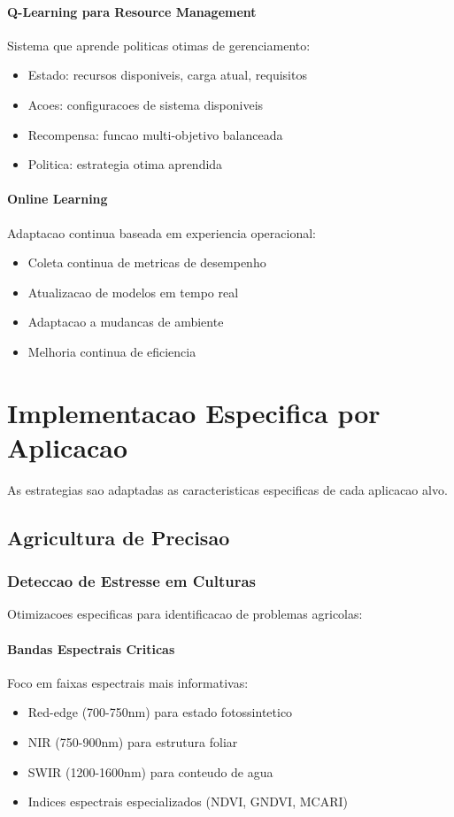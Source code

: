 \paragraph{Q-Learning para Resource Management}
Sistema que aprende politicas otimas de gerenciamento:
\begin{itemize}
    \item Estado: recursos disponiveis, carga atual, requisitos
    \item Acoes: configuracoes de sistema disponiveis
    \item Recompensa: funcao multi-objetivo balanceada
    \item Politica: estrategia otima aprendida
\end{itemize}

\paragraph{Online Learning}
Adaptacao continua baseada em experiencia operacional:
\begin{itemize}
    \item Coleta continua de metricas de desempenho
    \item Atualizacao de modelos em tempo real
    \item Adaptacao a mudancas de ambiente
    \item Melhoria continua de eficiencia
\end{itemize}

\section{Implementacao Especifica por Aplicacao}\label{sec:implementacao_aplicacao}

As estrategias sao adaptadas as caracteristicas especificas de cada aplicacao alvo.

\subsection{Agricultura de Precisao}

\subsubsection{Deteccao de Estresse em Culturas}
Otimizacoes especificas para identificacao de problemas agricolas:

\paragraph{Bandas Espectrais Criticas}
Foco em faixas espectrais mais informativas:
\begin{itemize}
    \item Red-edge (700-750nm) para estado fotossintetico
    \item NIR (750-900nm) para estrutura foliar
    \item SWIR (1200-1600nm) para conteudo de agua
    \item Indices espectrais especializados (NDVI, GNDVI, MCARI)
\end{itemize}

